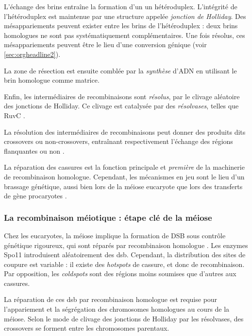 \documentclass[11pt, oneside]{scrartcl}
\begin{document}
L'échange des brins entraîne la formation d'un un hétéroduplex. L'intégrité de
l'hétéroduplex est maintenue par une structure appelée \emph{jonction de Holliday}.
Des mésappariements peuvent exister entre les brins de l'hétéroduplex : deux
brins homologues ne sont pas systématiquement complémentaires. Une fois résolus,
ces mésappariements peuvent être le lieu d'une conversion génique (voir
\ref{sec:orgheadline2}).

La zone de résection est ensuite comblée par la \emph{synthèse} d'ADN en utilisant le
brin homologue comme matrice. 

Enfin, les intermédiaires de recombinaisons sont \emph{résolus}, par le clivage
aléatoire des jonctions de Holliday. Ce clivage est catalysée par des
\emph{résolvases}, telles que RuvC \cite{gorecka_crystal_2013}. 

La résolution des intermédiaires de recombinaisons peut donner des produits dits
crossovers ou non-crossovers, entraînant respectivement l'échange des régions
flanquantes ou non \cite{mancera_high-resolution_2008}.

\begin{transition}
La réparation des cassures est la fonction principale et \emph{première} de la
machinerie de recombinaison homologue. Cependant, les mécanismes en jeu sont le
lieu d'un brassage génétique, aussi bien lors de la méiose eucaryote que lors
des transferts de gène procaryotes \cite{redfield_bacteria_2001}.
\end{transition}

\subsubsection{La recombinaison méiotique : étape clé de la méiose}
\label{sec:orgheadline4}

Chez les eucaryotes, la méiose implique la formation de DSB sous contrôle
génétique rigoureux, qui sont réparés par recombinaison homologue
\cite{chapman_playing_2012}. Les enzymes Spo11 introduisent aléatoirement des
\ac{dsb}. Cependant, la distribution des sites de coupure est variable : il
existe des \emph{hotspots} de cassure, et donc de recombinaison. Par opposition, les
\emph{coldspots} sont des régions moins soumises que d'autres aux cassures.

La réparation de ces \ac{dsb} par recombinaison homologue est requise pour
l'appariement et la ségrégation des chromosomes homologues au cours de la
méiose. Selon le mode de clivage des jonctions de Holliday par les résolvases,
des crossovers se forment entre les chromosomes parentaux. 
\end{document}
